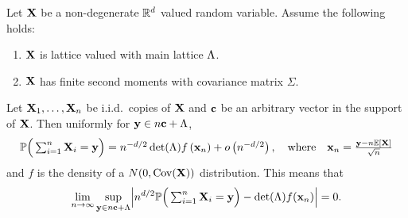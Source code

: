 \begin{theorem}
    \label{thm:normal-multi-llt}
    Let ${\mathbf X}$ be a non-degenerate ${\mathbb R}^d$ valued random variable. Assume the following holds:
    \begin{enumerate}
        \item ${\mathbf X}$ is lattice valued with main lattice $\Lambda$.
        \item ${\mathbf X}$ has finite second moments with covariance matrix $\Sigma$.
    \end{enumerate}
    Let ${\mathbf X}_1, \ldots, {\mathbf X}_n$ be i.i.d.\ copies of ${\mathbf X}$ and ${\mathbf c}$ be an arbitrary vector in the support of ${\mathbf X}$. Then uniformly for ${\mathbf y} \in n{\mathbf c} + \Lambda$,
    \begin{equation*}
        {\mathbb P}\Big(
            \textstyle \sum_{i=1}^n {\mathbf X}_i = {\mathbf y}
        \Big)
        = n^{-d/2} \det(\Lambda) f\left( {\mathbf x}_n \right) + o \left( n^{-d/2} \right),
        \quad \text{where} \quad
        {\mathbf x}_n = \frac{{\mathbf y} - n {\mathbb E}[{\mathbf X}]}{\sqrt{n}}
    \end{equation*}
    and $f$ is the density of a $N(0, \operatorname{Cov}({\mathbf X}))$ distribution. This means that
    \begin{equation*}
        \lim_{n \to \infty} \sup_{\vy \in n \vc + \lattice} \abs*{
            n^{d/2} \P\Big( \textstyle \sum_{i=1}^n \vX_i = \vy \Big)
            - \det(\lattice) f(\vx_n)
        } = 0.
    \end{equation*}
\end{theorem}